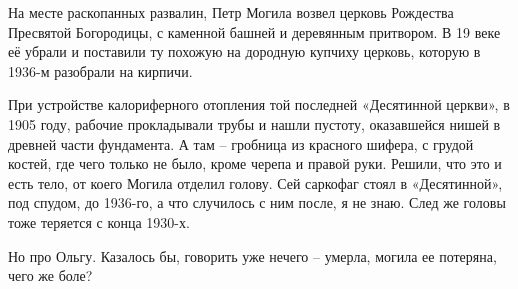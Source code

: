 
На месте раскопанных развалин, Петр Могила возвел церковь Рождества Пресвятой Богородицы, с каменной башней и деревянным притвором. В 19 веке её убрали и поставили ту похожую на дородную купчиху церковь, которую в 1936-м разобрали на кирпичи. 

При устройстве калориферного отопления той последней «Десятинной церкви», в 1905 году, рабочие прокладывали трубы и нашли пустоту, оказавшейся нишей в древней части фундамента. А там – гробница из красного шифера, с грудой костей, где чего только не было, кроме черепа и правой руки. Решили, что это и есть тело, от коего Могила отделил голову. Сей саркофаг стоял в «Десятинной», под спудом, до 1936-го, а что случилось с ним после, я не знаю. След же головы тоже теряется с конца 1930-х.

Но про Ольгу. Казалось бы, говорить уже нечего – умерла, могила ее потеряна, чего же боле?
